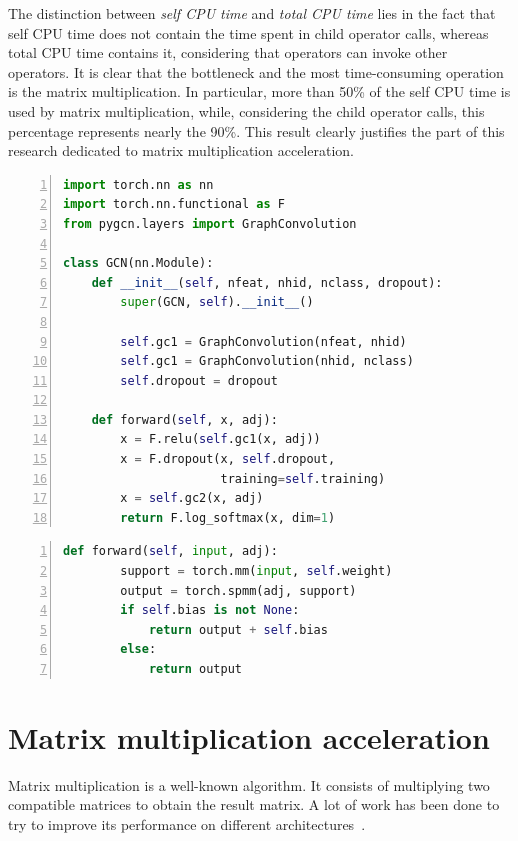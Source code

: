 The distinction between \textit{self CPU time} and \textit{total CPU time} lies in the fact that self CPU time does not contain the time spent in child operator calls, whereas total CPU time contains it, considering that operators can invoke other operators.
It is clear that the bottleneck and the most time-consuming operation is the matrix multiplication.
In particular, more than 50\% of the self CPU time is used by matrix multiplication, while, considering the child operator calls, this percentage represents nearly the 90\%.
This result clearly justifies the part of this research dedicated to matrix multiplication acceleration.

\begin{lstlisting}[language=Python,label={lst:gcn-class}, numbers=left, xleftmargin=2em, caption=Class of GCN model]
import torch.nn as nn
import torch.nn.functional as F
from pygcn.layers import GraphConvolution

class GCN(nn.Module):
    def __init__(self, nfeat, nhid, nclass, dropout):
        super(GCN, self).__init__()

        self.gc1 = GraphConvolution(nfeat, nhid)
        self.gc1 = GraphConvolution(nhid, nclass)
        self.dropout = dropout

    def forward(self, x, adj):
        x = F.relu(self.gc1(x, adj))
        x = F.dropout(x, self.dropout,
                      training=self.training)
        x = self.gc2(x, adj)
        return F.log_softmax(x, dim=1)
\end{lstlisting}


\begin{lstlisting}[language=Python,label={lst:gcn-layer-forward}, numbers=left, xleftmargin=2em, caption=Forward function of GCN layer]
    def forward(self, input, adj):
        support = torch.mm(input, self.weight)
        output = torch.spmm(adj, support)
        if self.bias is not None:
            return output + self.bias
        else:
            return output
\end{lstlisting}

\section{Matrix multiplication acceleration}
\label{sec:matmul-acceleration}%

Matrix multiplication is a well-known algorithm.
It consists of multiplying two compatible matrices to obtain the result matrix.
A lot of work has been done to try to improve its performance on different architectures~\cite{DBLP:journals/corr/abs-2003-00532, opt_cuda_matmul}.

